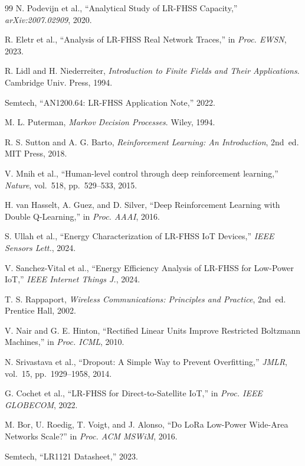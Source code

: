 \documentclass[conference]{IEEEtran}
\begin{document}
\begin{thebibliography}{99}
		N. Podevijn et al.,
		``Analytical Study of LR-FHSS Capacity,'' \textit{arXiv:2007.02909}, 2020.
		
		R. Eletr et al.,
		``Analysis of LR-FHSS Real Network Traces,''
		in \textit{Proc. EWSN}, 2023.
		
		R. Lidl and H. Niederreiter,
		\textit{Introduction to Finite Fields and Their Applications}.
		Cambridge Univ. Press, 1994.
		
		Semtech, ``AN1200.64: LR-FHSS Application Note,'' 2022.
		
		M. L. Puterman,
		\textit{Markov Decision Processes}. Wiley, 1994.
		
		R. S. Sutton and A. G. Barto,
		\textit{Reinforcement Learning: An Introduction}, 2nd~ed. MIT Press, 2018.
		
		V. Mnih et al.,
		``Human-level control through deep reinforcement learning,''
		\textit{Nature}, vol.~518, pp.~529--533, 2015.
		
		H. van Hasselt, A. Guez, and D. Silver,
		``Deep Reinforcement Learning with Double Q-Learning,''
		in \textit{Proc. AAAI}, 2016.
		
		S. Ullah et al.,
		``Energy Characterization of LR-FHSS IoT Devices,''
		\textit{IEEE Sensors Lett.}, 2024.
		
		V. Sanchez-Vital et al.,
		``Energy Efficiency Analysis of LR-FHSS for Low-Power IoT,''
		\textit{IEEE Internet Things J.}, 2024.
		
		T. S. Rappaport,
		\textit{Wireless Communications: Principles and Practice}, 2nd~ed.
		Prentice Hall, 2002.
		
		V. Nair and G. E. Hinton,
		``Rectified Linear Units Improve Restricted Boltzmann Machines,''
		in \textit{Proc. ICML}, 2010.
		
		N. Srivastava et al.,
		``Dropout: A Simple Way to Prevent Overfitting,''
		\textit{JMLR}, vol.~15, pp.~1929--1958, 2014.
		
		G. Cochet et al.,
		``LR-FHSS for Direct-to-Satellite IoT,''
		in \textit{Proc. IEEE GLOBECOM}, 2022.
		
		M. Bor, U. Roedig, T. Voigt, and J. Alonso,
		``Do LoRa Low-Power Wide-Area Networks Scale?''
		in \textit{Proc. ACM MSWiM}, 2016.
		
		Semtech, ``LR1121 Datasheet,'' 2023.
		
	\end{thebibliography}
	
\end{document}
